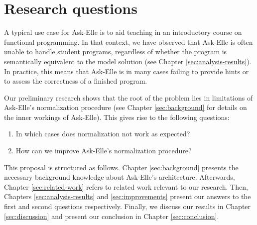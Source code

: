 \section{Research questions}
\label{sec:research-questions}

A typical use case for Ask-Elle is to aid teaching in an introductory course on functional programming. In that context, we have observed that Ask-Elle is often unable to handle student programs, regardless of whether the program is semantically equivalent to the model solution (see Chapter \ref{sec:analysis-results}). In practice, this means that Ask-Elle is in many cases failing to provide hints or to assess the correctness of a finished program.

Our preliminary research shows that the root of the problem lies in limitations of Ask-Elle's normalization procedure (see Chapter \ref{sec:background} for details on the inner workings of Ask-Elle). This gives rise to the following questions:

\begin{enumerate}
    \item In which cases does normalization not work as expected?
    \item How can we improve Ask-Elle's normalization procedure?
\end{enumerate}

This proposal is structured as follows. Chapter \ref{sec:background} presents the necessary background knowledge about Ask-Elle's architecture. Afterwards, Chapter \ref{sec:related-work} refers to related work relevant to our research. Then, Chapters \ref{sec:analysis-results} and \ref{sec:improvements} present our answers to the first and second questions respectively. Finally, we discuss our results in Chapter \ref{sec:discussion} and present our conclusion in Chapter \ref{sec:conclusion}.

